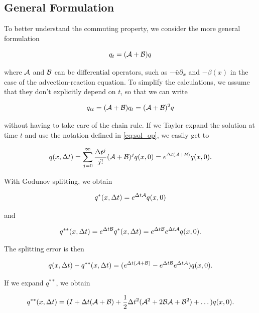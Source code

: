 \documentclass[journal,onecolumn]{IEEEtran}
\begin{document}

\subsection{General Formulation}

To better understand the commuting property, we consider the more general formulation

\begin{equation}
	q_t = (\mathcal{A}+\mathcal{B})q
\end{equation}

where $\mathcal{A}$ and $\mathcal{B}$ can be differential operators, such as $-\bar{u}\partial_x$ and $-\beta(x)$ in the case of the advection-reaction equation. To simplify the calculations, we assume that they don't explicitly depend on $t$, so that we can write

\begin{equation}
	q_{tt} = (\mathcal{A}+\mathcal{B})q_t=(\mathcal{A}+\mathcal{B})^2q
\end{equation}

without having to take care of the chain rule. If we Taylor expand the solution at time $t$ and use the notation defined in \eqref{eq:sol_op}, we easily get to

\begin{equation}\label{eq:exp_unsplit}
	q(x,\Delta t) = \sum_{j=0}^{\infty}\frac{\Delta t^j}{j!}(\mathcal{A} + \mathcal{B})^jq(x,0) = e^{\Delta t(\mathcal{A} +\mathcal{B})}q(x,0).
\end{equation}

With Godunov splitting, we obtain

\begin{equation}
	q^*(x,\Delta t)=e^{\Delta t \mathcal{A}}q(x,0)
\end{equation}

and

\begin{equation}
	q^{**}(x,\Delta t)=e^{\Delta t \mathcal{B}}q^*(x,\Delta t) = e^{\Delta t \mathcal{B}}e^{\Delta t \mathcal{A}}q(x,0).
\end{equation}

The splitting error is then

\begin{equation}
	q(x,\Delta t)-q^{**}(x,\Delta t) = (e^{\Delta t(\mathcal{A} +\mathcal{B})}-e^{\Delta t \mathcal{B}}e^{\Delta t \mathcal{A}})q(x,0).
\end{equation}

If we expand $q^{**}$, we obtain

\begin{equation}\label{eq:exp_split}
	q^{**}(x,\Delta t) = (I+\Delta t(\mathcal{A} + \mathcal{B})+\frac{1}{2}\Delta t^2(\mathcal{A}^2+2\mathcal{B}\mathcal{A}+\mathcal{B}^2)+\dots)q(x,0).
\end{equation}
\end{document}
